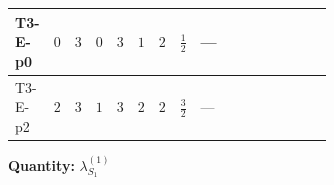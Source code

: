 \documentclass[8pt]{article}
\begin{document}
\begin{landscape}
\begin{longtable}{@{}llcccccc >{\raggedright\arraybackslash}p{0.21\linewidth} >{\raggedright\arraybackslash}p{0.21\linewidth} >{\raggedright\arraybackslash}p{0.21\linewidth}@{}}
\midrule
T3-E-p0 & $0$ & $3$ & $0$ & $3$ & $1$ & $2$ & $\frac{1}{2}$ & --- & \scriptsize\adjustbox{max width=\linewidth}{$\begin{gathered} +6 {\lambda_{12}^{(1)}}^2\end{gathered}$} & \scriptsize\adjustbox{max width=\linewidth}{$\begin{gathered} +4 {\lambda_{HS_1}^{(1)}}^2\end{gathered}$} \\
\midrule
T3-E-p2 & $2$ & $3$ & $1$ & $3$ & $2$ & $2$ & $\frac{3}{2}$ & --- & \scriptsize\adjustbox{max width=\linewidth}{$\begin{gathered} +6 {\lambda_{12}^{(1)}}^2\end{gathered}$} & \scriptsize\adjustbox{max width=\linewidth}{$\begin{gathered} +4 {\lambda_{HS_1}^{(1)}}^2\end{gathered}$} \\
\midrule
\bottomrule
\end{longtable}
\clearpage
\noindent\textbf{Quantity: }$\lambda_{S_1}^{(1)}$\par\smallskip

\end{landscape}
\end{document}
